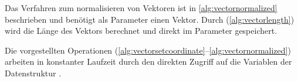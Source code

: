 Das Verfahren zum normalisieren von Vektoren ist in \autoref{alg:vectornormalized} beschrieben und benötigt als
 Parameter einen Vektor. Durch  (\autoref{alg:vectorlength}) wird die Länge des Vektors berechnet und
 direkt im Parameter gespeichert.




Die vorgestellten Operationen (\autoref{alg:vectorsetcoordinate}--\autoref{alg:vectornormalized}) arbeiten in konstanter Laufzeit durch den direkten Zugriff auf die Variablen der Datenstruktur .

